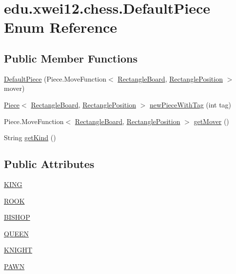 \hypertarget{enumedu_1_1xwei12_1_1chess_1_1_default_piece}{}\section{edu.\+xwei12.\+chess.\+Default\+Piece Enum Reference}
\label{enumedu_1_1xwei12_1_1chess_1_1_default_piece}
\subsection*{Public Member Functions}
\begin{DoxyCompactItemize}
\item 
\hyperlink{enumedu_1_1xwei12_1_1chess_1_1_default_piece_a3059ec14c125a325f32d7a29e12b8fff}{Default\+Piece} (Piece.\+Move\+Function$<$ \hyperlink{classedu_1_1xwei12_1_1chess_1_1_rectangle_board}{Rectangle\+Board}, \hyperlink{classedu_1_1xwei12_1_1chess_1_1_rectangle_position}{Rectangle\+Position} $>$ mover)
\item 
\hyperlink{classedu_1_1xwei12_1_1chess_1_1_piece}{Piece}$<$ \hyperlink{classedu_1_1xwei12_1_1chess_1_1_rectangle_board}{Rectangle\+Board}, \hyperlink{classedu_1_1xwei12_1_1chess_1_1_rectangle_position}{Rectangle\+Position} $>$ \hyperlink{enumedu_1_1xwei12_1_1chess_1_1_default_piece_a3759f821cc5aa4cd0bee1000c625bedf}{new\+Piece\+With\+Tag} (int tag)
\item 
Piece.\+Move\+Function$<$ \hyperlink{classedu_1_1xwei12_1_1chess_1_1_rectangle_board}{Rectangle\+Board}, \hyperlink{classedu_1_1xwei12_1_1chess_1_1_rectangle_position}{Rectangle\+Position} $>$ \hyperlink{enumedu_1_1xwei12_1_1chess_1_1_default_piece_aaa54e79e150686eecd49157bcccbc342}{get\+Mover} ()
\item 
String \hyperlink{enumedu_1_1xwei12_1_1chess_1_1_default_piece_a856f8ffee51531d4df918649ffab262d}{get\+Kind} ()
\end{DoxyCompactItemize}
\subsection*{Public Attributes}
\begin{DoxyCompactItemize}
\item 
\hyperlink{enumedu_1_1xwei12_1_1chess_1_1_default_piece_acfcc57b23edd8c55a27ccde783903fdd}{K\+I\+NG}
\item 
\hyperlink{enumedu_1_1xwei12_1_1chess_1_1_default_piece_af1515056ef8ca028d9ffa78928bd210d}{R\+O\+OK}
\item 
\hyperlink{enumedu_1_1xwei12_1_1chess_1_1_default_piece_aef91d35be3261782e80df06a566be2f6}{B\+I\+S\+H\+OP}
\item 
\hyperlink{enumedu_1_1xwei12_1_1chess_1_1_default_piece_a921844f485161196a36ec332630085d9}{Q\+U\+E\+EN}
\item 
\hyperlink{enumedu_1_1xwei12_1_1chess_1_1_default_piece_abd7f561f396be3df6d124b91f3183b1d}{K\+N\+I\+G\+HT}
\item 
\hyperlink{enumedu_1_1xwei12_1_1chess_1_1_default_piece_a04edb1ff8e7cad1370b4fcdde10e48a5}{P\+A\+WN}
\end{DoxyCompactItemize}


